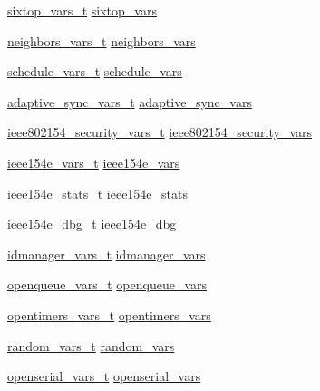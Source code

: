 \begin{DoxyCompactItemize}
\item 
\hyperlink{structsixtop__vars__t}{sixtop\+\_\+vars\+\_\+t} \hyperlink{struct_open_mote_ad24878ab2750f25cb31f1f1896df9129}{sixtop\+\_\+vars}
\item 
\hyperlink{structneighbors__vars__t}{neighbors\+\_\+vars\+\_\+t} \hyperlink{struct_open_mote_a6d24b1df68cebe6b4e30bf6606875e19}{neighbors\+\_\+vars}
\item 
\hyperlink{structschedule__vars__t}{schedule\+\_\+vars\+\_\+t} \hyperlink{struct_open_mote_a0e4d8d8851e795fcee51cabfe38259cd}{schedule\+\_\+vars}
\item 
\hyperlink{structadaptive__sync__vars__t}{adaptive\+\_\+sync\+\_\+vars\+\_\+t} \hyperlink{struct_open_mote_a46fd6d534d0e28197bdbd47463598890}{adaptive\+\_\+sync\+\_\+vars}
\item 
\hyperlink{structieee802154__security__vars__t}{ieee802154\+\_\+security\+\_\+vars\+\_\+t} \hyperlink{struct_open_mote_a2e1cf098b70a212c0137dcabf8a51326}{ieee802154\+\_\+security\+\_\+vars}
\item 
\hyperlink{structieee154e__vars__t}{ieee154e\+\_\+vars\+\_\+t} \hyperlink{struct_open_mote_ab16c29e7d0986128622698836ea1d01f}{ieee154e\+\_\+vars}
\item 
\hyperlink{structieee154e__stats__t}{ieee154e\+\_\+stats\+\_\+t} \hyperlink{struct_open_mote_aad80fcc3f8dc5dae8184c964a3ebcb77}{ieee154e\+\_\+stats}
\item 
\hyperlink{structieee154e__dbg__t}{ieee154e\+\_\+dbg\+\_\+t} \hyperlink{struct_open_mote_a31e50da96e526495ff1c49873ae60ea9}{ieee154e\+\_\+dbg}
\item 
\hyperlink{structidmanager__vars__t}{idmanager\+\_\+vars\+\_\+t} \hyperlink{struct_open_mote_aee86d15881d8b0681a1f0c292536888c}{idmanager\+\_\+vars}
\item 
\hyperlink{structopenqueue__vars__t}{openqueue\+\_\+vars\+\_\+t} \hyperlink{struct_open_mote_a386f53172313c33476c0fb5de4daf54e}{openqueue\+\_\+vars}
\item 
\hyperlink{structopentimers__vars__t}{opentimers\+\_\+vars\+\_\+t} \hyperlink{struct_open_mote_ad90befaa4329ea1edce6ca5c2697e8b1}{opentimers\+\_\+vars}
\item 
\hyperlink{structrandom__vars__t}{random\+\_\+vars\+\_\+t} \hyperlink{struct_open_mote_ac39c7ed7d81f99bb3759327ecc34b020}{random\+\_\+vars}
\item 
\hyperlink{structopenserial__vars__t}{openserial\+\_\+vars\+\_\+t} \hyperlink{struct_open_mote_afd8c3a10c7a45dd24412299494f22dfd}{openserial\+\_\+vars}
\item 

\end{DoxyCompactItemize}
